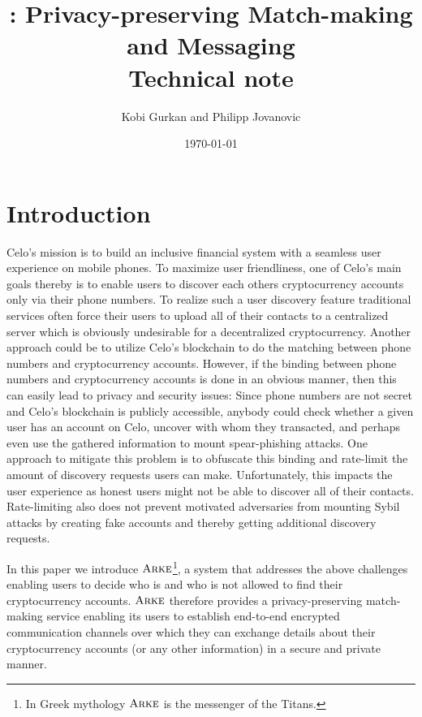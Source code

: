\documentclass[11pt,letterpaper]{article}
\title{\sys: Privacy-preserving Match-making and Messaging\\
{\large Technical note}
}
\author{Kobi Gurkan and Philipp Jovanovic}
\date{\today}
\theoremstyle{definition}
\newcommand{\sys}{\textsc{Arke}\xspace}
\begin{document}
\maketitle

\section{Introduction}


Celo's mission is to build an inclusive financial system with a seamless user
experience on mobile phones. To maximize user friendliness, one of Celo's main
goals thereby is to enable users to discover each others cryptocurrency accounts
only via their phone numbers. To realize such a user discovery feature
traditional services often force their users to upload all of their contacts to
a centralized server which is obviously undesirable for a decentralized
cryptocurrency. Another approach could be to utilize Celo's blockchain to do the
matching between phone numbers and cryptocurrency accounts. However, if the
binding between phone numbers and cryptocurrency accounts is done in an obvious
manner, then this can easily lead to privacy and security issues: Since phone
numbers are not secret and Celo's blockchain is publicly accessible, anybody
could check whether a given user has an account on Celo, uncover with whom they
transacted, and perhaps even use the gathered information to mount
spear-phishing attacks.  One approach to mitigate this problem is to obfuscate
this binding and rate-limit the amount of discovery requests users can make.
Unfortunately, this impacts the user experience as honest users might not be
able to discover all of their contacts. Rate-limiting also does not prevent
motivated adversaries from mounting Sybil attacks by creating fake accounts and
thereby getting additional discovery requests.

In this paper we introduce $\sys$\footnote{In Greek mythology $\sys$ is the
  messenger of the Titans.}, a system that addresses the above challenges enabling
users to decide who is and who is not allowed to find their cryptocurrency
accounts. $\sys$ therefore provides a privacy-preserving match-making service
enabling its users to establish end-to-end encrypted communication channels over
which they can exchange details about their cryptocurrency accounts (or any
other information) in a secure and private manner.
\end{document}
